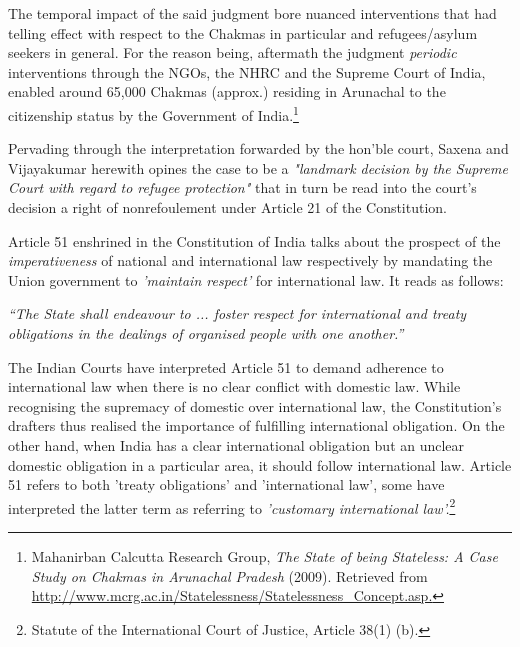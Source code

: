 \begin{multicols}{2}
\vspace{-.15cm}

\noi
The temporal impact of the said judgment bore nuanced interventions that had telling effect
with respect to the Chakmas in particular and refugees/asylum seekers in general. For the
reason being, aftermath the judgment \textit{periodic} interventions through the NGOs, the NHRC
and the Supreme Court of India, enabled around 65,000 Chakmas (approx.) residing in
Arunachal to the citizenship status by the Government of India.\footnote{Mahanirban Calcutta Research Group, \textit{The State of being Stateless: A Case Study on Chakmas in Arunachal Pradesh} (2009). Retrieved from \url{http://www.mcrg.ac.in/Statelessness/Statelessness_Concept.asp.}}

\vspace{-.15cm}

\noi
Pervading through the interpretation forwarded by the hon’ble court, Saxena and
Vijayakumar herewith opines the case to be a  \textit{"landmark decision by the Supreme Court with
regard to refugee protection"} that in turn be read into the court's decision a right of nonrefoulement under Article 21 of the Constitution.

\vspace{-.15cm}


\vspace{-.15cm}

\noi
Article 51 enshrined in the Constitution of India talks about the prospect of the
\textit{imperativeness} of national and international law respectively by mandating the Union
government to \textit{'maintain respect'} for international law. It reads as follows:

\noi
\textit{“The State shall endeavour to ... foster respect for international and treaty obligations in
the dealings of organised people with one another.”}

\noi
The Indian Courts have interpreted Article 51 to demand adherence to international law when
there is no clear conflict with domestic law. While recognising the supremacy of domestic
over international law, the Constitution's drafters thus realised the importance of fulfilling
international obligation. On the other hand, when India has a clear international obligation
but an unclear domestic obligation in a particular area, it should follow international law.
Article 51 refers to both 'treaty obligations' and 'international law', some have interpreted the
latter term as referring to \textit{'customary international law'.}\footnote{Statute of the International Court of Justice, Article 38(1) (b).}


\end{multicols}
